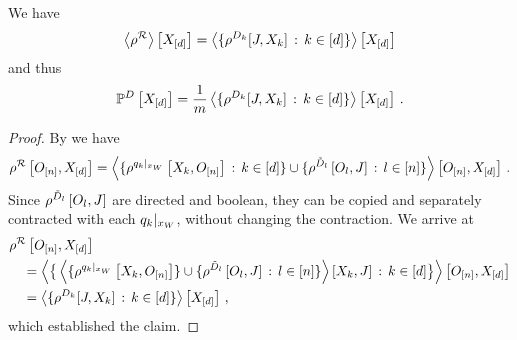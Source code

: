 \begin{theorem}
    \label{the:extractionDataCores}
    We have
    \begin{align*}
        \left\langle \rho^{\mathcal{R}}\right\rangle \left[ X_{[d]} \right]
        = \left\langle \{\rho^{D_{k}}[J,X_{k}] \, : \, k\in[d]\}\right\rangle \left[ X_{[d]} \right]
    \end{align*}
    and thus
    \begin{align*}
        \mathbb{P}^{D}\left[X_{[d]}\right]
        = \frac{1}{m} \left\langle \{\rho^{D_{k}}[J,X_{k}]  \, : \, k\in[d]\}\right\rangle \left[ X_{[d]} \right] \, .
    \end{align*}
\end{theorem}
\begin{proof}
    By  we have
    \begin{align*}
        \rho^{\mathcal{R}}\left[O_{[n]},X_{[d]}\right] =
        \left\langle 
            \{\rho^{{q_{k}}|_{x_{W}}}\left[X_{k},O_{[n]}\right] \, : \, k\in[d]\}
            \cup \{\rho^{\tilde{D}_{l}}\left[O_{l},J\right] \, : \, l\in[n]\}
        \right\rangle \left[ O_{[n]},X_{[d]} \right] \, .
    \end{align*}
    Since $\rho^{\tilde{D}_{l}}\left[O_{l},J\right]$ are directed and boolean, they can be copied and separately contracted with each ${q_{k}}|_{x_{W}}$, without changing the contraction.
    We arrive at
    \begin{align*}
        &\rho^{\mathcal{R}}\left[O_{[n]},X_{[d]}\right] \\
        &\quad = \left\langle 
            \big\{\left\langle 
                \{\rho^{{q_{k}}|_{x_{W}}}\left[X_{k},O_{[n]}\right]\}
                \cup \{\rho^{\tilde{D}_{l}}\left[O_{l},J\right] \, : \, l\in[n]\}
            \right\rangle \left[ X_{k},J \right] \, : \, k\in[d] \big\}
        \right\rangle \left[ O_{[n]},X_{[d]} \right] \\
        & \quad =  \left\langle \{\rho^{D_{k}}[J,X_{k}]  \, : \, k\in[d]\}\right\rangle \left[ X_{[d]} \right] \, ,
    \end{align*}
    which established the claim.
\end{proof}

